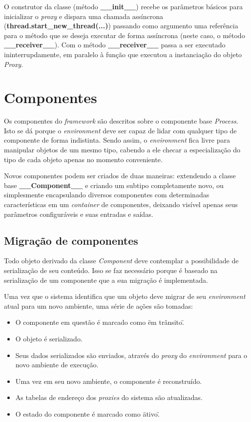 O construtor da classe (método \textbf{\_\_init\_\_}) recebe os parâmetros básicos para inicializar o \textit{proxy} e dispara uma chamada assíncrona (\textbf{thread.start\_new\_thread(...)}) passando como argumento uma referência para o método que se deseja executar de forma assíncrona (neste caso, o método \textbf{\_\_receiver\_\_}). Com o método \textbf{\_\_receiver\_\_} passa a ser executado ininterrupdamente, em paralelo à função que executou a instanciação do objeto \textit{Proxy}.

\section{Componentes \label{implement_components}}

Os componentes do \textit{framework} são descritos sobre o componente base \textit{Process}. Isto se dá porque o \textit{environment} deve ser capaz de lidar com qualquer tipo de componente de forma indistinta. Sendo assim, o \textit{environment} fica livre para manipular objetos de um mesmo tipo, cabendo a ele checar a especialização do tipo de cada objeto apenas no momento conveniente.

Novos componentes podem ser criados de duas maneiras: extendendo a classe base \textbf{\_\_Component\_\_} e criando um subtipo completamente novo, ou simplesmente encapsulando diversos componentes com determinadas características em um \textit{container} de componentes, deixando visível apenas seus parâmetros configuráveis e suas entradas e saídas.

\subsection{Migração de componentes \label{migrar_componentes}}

Todo objeto derivado da classe \textit{Component} deve contemplar a possibilidade de serialização de seu conteúdo. Isso se faz necessário porque é baseado na serialização de um componente que a sua migração é implementada.

Uma vez que o sistema identifica que um objeto deve migrar de seu \textit{environment} atual para um novo ambiente, uma série de ações são tomadas:

\begin{itemize}
	\item O componente em questão é marcado como \"em trânsito\".
	\item O objeto é serializado.
	\item Seus dados serializados são enviados, através do \textit{proxy} do \textit{environment} para o novo ambiente de execução.
	\item Uma vez em seu novo ambiente, o componente é reconstruído.
	\item As tabelas de endereço dos \textit{proxies} do sistema são atualizadas.
	\item O estado do componente é marcado como \"ativo\".
\end{itemize}

